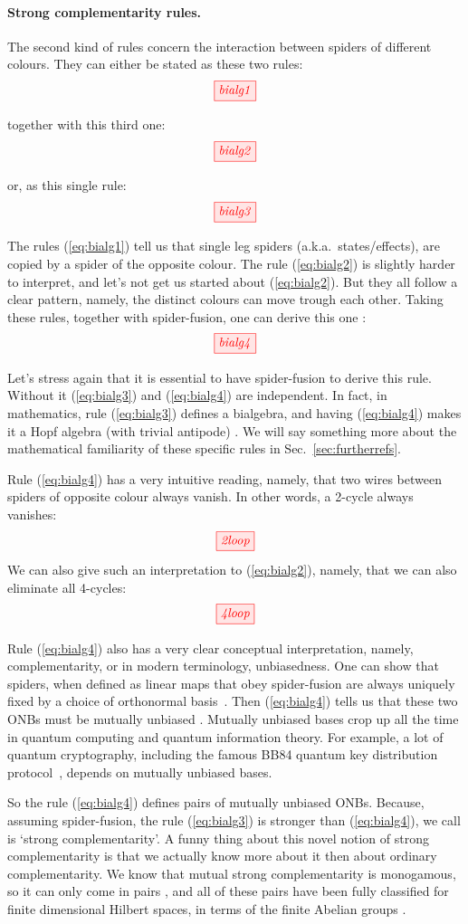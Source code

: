 \documentclass[11pt]{article}
\theoremstyle{definition}
\newcommand{\beq}{\begin{equation}}
\newcommand{\eeq}{\end{equation}\par\noindent}
\begin{document}
\paragraph{Strong complementarity rules.}  The second kind of rules concern the interaction between spiders of different colours.
They can either be stated as these two rules:   
\beq\label{eq:bialg1}
\tikzfig{bialg1} 
\eeq
together with this third one: 
\beq\label{eq:bialg2}
\tikzfig{bialg2} 
\eeq 
or, as this single rule:
\beq\label{eq:bialg3}
\tikzfig{bialg3} 
\eeq
The rules (\ref{eq:bialg1}) tell us that single leg spiders (a.k.a.~states/effects), are copied by a spider of the opposite colour. The rule (\ref{eq:bialg2}) is slightly harder to interpret, and let's not get us started about (\ref{eq:bialg2}).
But they all follow a clear pattern, namely, the distinct colours can move trough each other. Taking these rules, together with spider-fusion, one can derive this one \cite{CD2}:
\beq\label{eq:bialg4}
\tikzfig{bialg4} 
\eeq
Let's stress again that it is essential to have spider-fusion to derive this rule.  Without it (\ref{eq:bialg3}) and (\ref{eq:bialg4}) are independent.  In fact, in mathematics, rule (\ref{eq:bialg3}) defines a bialgebra, and having (\ref{eq:bialg4}) makes it a Hopf algebra (with trivial antipode) \cite{cartier2007primer}.  We will say something more about the mathematical familiarity of these specific rules in Sec.~\ref{sec:furtherrefs}. 

Rule (\ref{eq:bialg4}) has a very intuitive reading, namely, that two wires between spiders of opposite colour always vanish.  In other words, a 2-cycle always vanishes: 
\[ 
\tikzfig{2loop}
\]
We can also give such an interpretation to (\ref{eq:bialg2}), namely, that we can also eliminate all 4-cycles:   
\[ 
\tikzfig{4loop}
\]

Rule (\ref{eq:bialg4}) also has a very clear conceptual interpretation, namely, complementarity, or in modern terminology, unbiasedness.  One can show that spiders, when defined as linear maps that obey spider-fusion are always uniquely fixed by a choice of orthonormal basis~\cite{CPV}.  Then (\ref{eq:bialg4}) tells us that these two ONBs must be mutually unbiased \cite{CD2, CKbook}. Mutually unbiased bases crop up all the time in quantum computing and quantum information theory. For example, a lot of quantum cryptography, including the famous BB84 quantum key distribution protocol~\cite{BB84}, depends on mutually unbiased bases.


So the rule (\ref{eq:bialg4}) defines pairs of mutually unbiased ONBs.  Because, assuming spider-fusion,  the rule (\ref{eq:bialg3}) is stronger than  (\ref{eq:bialg4}), we call is `strong complementarity'.  A funny thing about this novel notion of strong complementarity is that we actually know more about it then about ordinary complementarity.  We know that mutual strong complementarity is monogamous, so it can only come in pairs \cite[Thm.~9.66]{CKbook}, and all of these pairs have been fully classified for finite dimensional Hilbert spaces, in terms of the finite Abelian groups \cite{CDKZ}.
\end{document}
